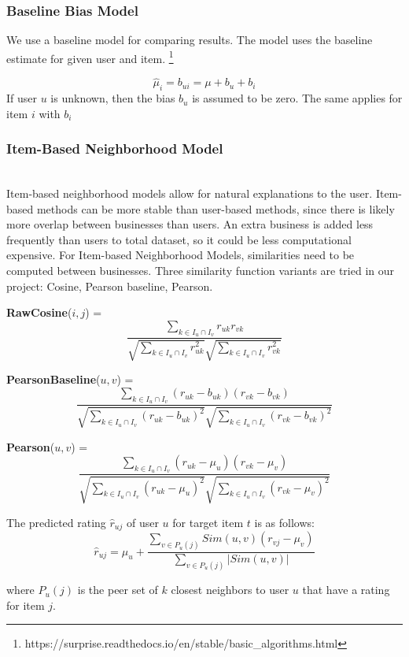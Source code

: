 \documentclass[journal]{IEEEtran}
\begin{document}
\subsubsection{Baseline Bias Model}
We use a baseline model for comparing results. The model uses the baseline estimate for given user and item. \footnote{https://surprise.readthedocs.io/en/stable/basic\_algorithms.html}

$$\hat \mu_i = b_{ui} = \mu + b_u + b_i$$
If user $u$ is unknown, then the bias $b_u$ is assumed to be zero. The same applies for item $i$ with $b_i$

\subsubsection{Item-Based Neighborhood Model}
   \\Item-based  neighborhood  models allow for natural explanations to the user. Item-based  methods  can  be  more  stable  than  user-based methods, since there is likely more overlap between businesses than users. An extra business is added less  frequently  than  users  to  total  dataset,  so  it could be less computational expensive.
For Item-based Neighborhood Models, similarities need to be computed between businesses. Three similarity function variants are tried in our project: Cosine, Pearson baseline, Pearson. 


{\bf RawCosine}($i, j$) = $$\frac{\sum_{k \in I_u \cap I_v} r_{uk} r_{vk}}{\sqrt{\sum_{k \in I_u \cap I_v}r_{uk}^2} \sqrt{\sum_{k \in I_u \cap I_v}r_{vk}^2}}$$

{\bf PearsonBaseline}($u, v$) = $$\frac{\sum_{k \in I_u \cap I_v} (r_{uk} - b_{uk})(r_{vk}-b_{vk})}{\sqrt{\sum_{k \in I_u \cap I_v}(r_{uk} - b_{uk})^2} \sqrt{\sum_{k \in I_u \cap I_v}(r_{vk} - b_{vk})^2}}$$

{\bf Pearson}($u, v$) = $$\frac{\sum_{k \in I_u \cap I_v} (r_{uk} - \mu_u)(r_{vk}-\mu_v)}{\sqrt{\sum_{k \in I_u \cap I_v}(r_{uk} - \mu_u)^2} \sqrt{\sum_{k \in I_u \cap I_v}(r_{vk} - \mu_v)^2}}$$

The predicted rating $\hat r_{uj}$ of user $u$ for target item $t$ is as follows:
$$\hat r_{uj} = \mu_u + \frac{\sum_{v \in P_u(j)} Sim(u,v) (r_{vj} - \mu_v)}{\sum_{v \in P_u(j)} |Sim(u, v)|}$$

where $P_u(j)$ is the peer set of $k$ closest neighbors to user $u$ that have a rating for item $j$.
\end{document}

